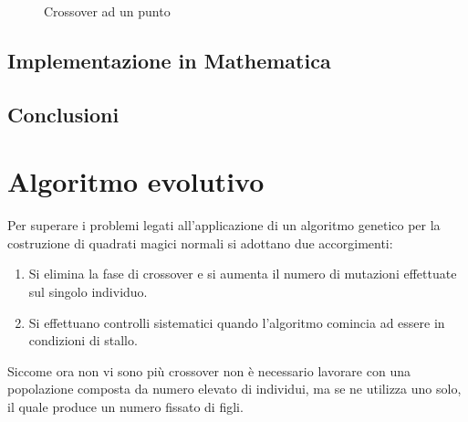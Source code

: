 \documentclass[italian,twoside,twocolumn]{article}
\begin{document}
\begin{figure}[!htbp]
	\centering
	\caption{Crossover ad un punto}
\end{figure}


\subsection{Implementazione in Mathematica}


\subsection{Conclusioni}

\section{Algoritmo evolutivo}
Per superare i problemi legati all'applicazione di un algoritmo genetico per la costruzione di quadrati magici normali si adottano due accorgimenti:
\begin{enumerate}
	\item Si elimina la fase di crossover e si aumenta il numero di mutazioni effettuate sul singolo individuo.
	\item Si effettuano controlli sistematici quando l'algoritmo comincia ad essere in condizioni di stallo. 
\end{enumerate}
Siccome ora non vi sono più crossover non è necessario lavorare con una popolazione composta da numero elevato di individui, ma se ne utilizza uno solo, il quale produce un numero fissato di figli. 
\end{document}
